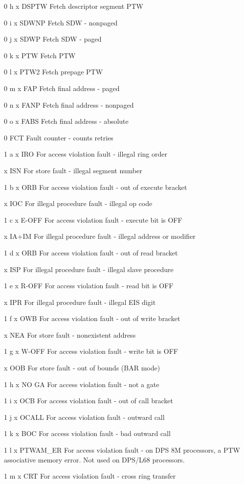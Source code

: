 0 h x DSPTW Fetch descriptor segment PTW

0 i x SDWNP Fetch SDW - nonpaged

0 j x SDWP Fetch SDW - paged

0 k x PTW Fetch PTW

0 l x PTW2 Fetch prepage PTW

0 m x FAP Fetch final address - paged

0 n x FANP Fetch final address - nonpaged

0 o x FABS Fetch final address - absolute

0 FCT Fault counter - counts retries

1 a x IRO For access violation fault - illegal ring order

x ISN For store fault - illegal segment number

1 b x ORB For access violation fault - out of execute bracket

x IOC For illegal procedure fault - illegal op code

1 c x E-OFF For access violation fault - execute bit is OFF

x IA+IM For illegal procedure fault - illegal address or modifier

1 d x ORB For access violation fault - out of read bracket

x ISP For illegal procedure fault - illegal slave procedure

1 e x R-OFF For access violation fault - read bit is OFF

x IPR For illegal procedure fault - illegal EIS digit

1 f x OWB For access violation fault - out of write bracket

x NEA For store fault - nonexistent address

1 g x W-OFF For access violation fault - write bit is OFF

x OOB For store fault - out of bounds (BAR mode)

1 h x NO GA For access violation fault - not a gate

1 i x OCB For access violation fault - out of call bracket

1 j x OCALL For access violation fault - outward call

1 k x BOC For access violation fault - bad outward call

1 l x PTWAM\_ER For access violation fault - on DPS 8M processors, a PTW
associative memory error. Not used on DPS/L68 processors.

1 m x CRT For access violation fault - cross ring transfer

